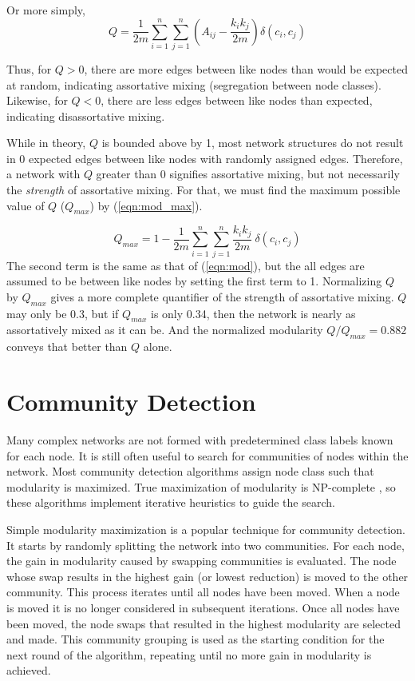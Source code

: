\documentclass{IEEEtran}
\begin{document}
	\noindent
	Or more simply,
	\begin{equation}
		\label{eqn:mod2}
		Q = \frac{1}{2m}\sum_{i=1}^{n}\sum_{j=1}^{n}\left(A_{ij} -\frac{k_ik_j}{2m}\right)\delta(c_i,c_j)
	\end{equation}
	
	Thus, for $Q>0$, there are more edges between like nodes than would be expected at random, indicating assortative mixing (segregation between node classes). Likewise, for $Q<0$, there are less edges between like nodes than expected, indicating disassortative mixing.
	
	While in theory, $Q$ is bounded above by 1, most network structures do not result in 0 expected edges between like nodes with randomly assigned edges. Therefore, a network with $Q$ greater than 0 signifies assortative mixing, but not necessarily the \textit{strength} of assortative mixing. For that, we must find the maximum possible value of $Q$ ($Q_{max}$) by (\ref{eqn:mod_max}).
	
	\begin{equation}
	\label{eqn:mod_max}
	Q_{max} = 1 - \frac{1}{2m}\sum_{i=1}^{n}\sum_{j=1}^{n}\frac{k_ik_j}{2m}~\delta(c_i,c_j)
	\end{equation}
	The second term is the same as that of (\ref{eqn:mod}), but the all edges are assumed to be between like nodes by setting the first term to 1. Normalizing $Q$ by $Q_{max}$ gives a more complete quantifier of the strength of assortative mixing. $Q$ may only be 0.3, but if $Q_{max}$ is only 0.34, then the network is nearly as assortatively mixed as it can be. And the normalized modularity $Q/Q_{max}=0.882$ conveys that better than $Q$ alone. 
	
	\section{Community Detection}
	\label{s:com}
	Many complex networks are not formed with predetermined class labels known for each node. It is still often useful to search for communities of nodes within the network. Most community detection algorithms assign node class such that modularity is maximized. True maximization of modularity is NP-complete \cite{NP}, so these algorithms implement iterative heuristics to guide the search.
	
	Simple modularity maximization is a popular technique for community detection\cite{simpleMM2}. It starts by randomly splitting the network into two communities. For each node, the gain in modularity caused by swapping communities is evaluated. The node whose swap results in the highest gain (or lowest reduction) is moved to the other community. This process iterates until all nodes have been moved. When a node is moved it is no longer considered in subsequent iterations. Once all nodes have been moved, the node swaps that resulted in the highest modularity are selected and made. This community grouping is used as the starting condition for the next round of the algorithm, repeating until no more gain in modularity is achieved.
	
\end{document}
